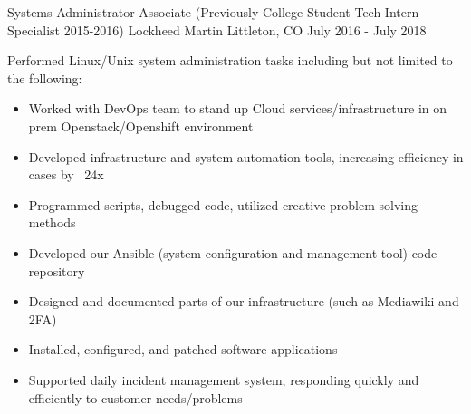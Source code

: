\begin{cventries}

\vspace{-1.25em}
\cventry
{Systems Administrator Associate (Previously College Student Tech Intern Specialist 2015-2016)} %
{Lockheed Martin} %
{Littleton, CO} %
{July 2016 - July 2018} %
{ %
\begin{cvitems}
\item {Performed Linux/Unix system administration tasks including but not limited to the following:}
  \begin{itemize}
  \item{Worked with DevOps team to stand up Cloud services/infrastructure in on prem Openstack/Openshift environment}
  \item{Developed infrastructure and system automation tools, increasing efficiency in cases by ~24x}
  \item{Programmed scripts, debugged code, utilized creative problem solving methods}
  \item{Developed our Ansible (system configuration and management tool) code repository}
  \item{Designed and documented parts of our infrastructure (such as Mediawiki and 2FA)}
  \item{Installed, configured, and patched software applications}
  \item{Supported daily incident management system, responding quickly and efficiently to customer needs/problems}
  \end{itemize}
\end{cvitems}
}



\end{cventries}
